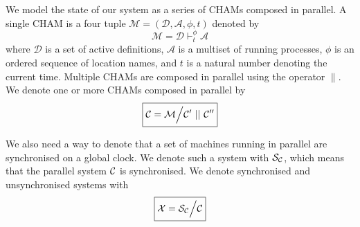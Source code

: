 We model the state of our system as a series of CHAMs composed in parallel. A
single CHAM is a four tuple $\mathcal{M} = (\mathcal{D}, \mathcal{A}, \phi, t)$
denoted by
\begin{equation*}
 \boxed{\mathcal{M} = \mathcal{D} \vdash^\phi_t \mathcal{A}}
\end{equation*}
where $\mathcal{D}$ is a set of active definitions, $\mathcal{A}$ is a multiset
of running processes, $\phi$ is an ordered sequence of location names, and $t$ is
a natural number denoting the current time. Multiple CHAMs are composed in
parallel using the operator $\parallel$. We denote one or more CHAMs composed
in parallel by
\begin{equation*}
 \boxed{\mathcal{C} = \mathcal{M} \Big\slash \mathcal{C}'~||~\mathcal{C}''}
\end{equation*}

We also need a way to denote that a set of machines running in parallel are
synchronised on a global clock. We denote such a system with $\mathcal{S}_{\mathcal{C}}$, which
means that the parallel system $\mathcal{C}$ is synchronised. We denote synchronised and
unsynchronised systems with
\begin{equation*}
 \boxed{\mathcal{X} = \mathcal{S}_{\mathcal{C}} \Big\slash \mathcal{C}}
\end{equation*}

